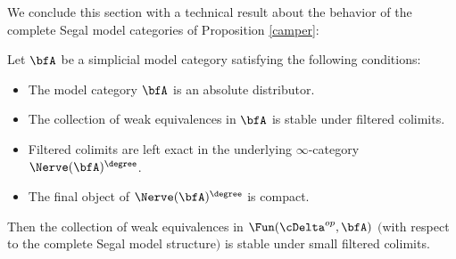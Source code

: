 We conclude this section with a technical result about the behavior of the complete
Segal model categories of Proposition \ref{camper}:

\begin{proposition}\label{smashet}
Let $\bfA$ be a simplicial model category satisfying the following conditions:
\begin{itemize}
\item[$(a)$] The model category $\bfA$ is an absolute distributor.
\item[$(b)$] The collection of weak equivalences in $\bfA$ is stable under filtered colimits.
\item[$(c)$] Filtered colimits are left exact in the underlying $\infty$-category $\Nerve( \bfA)^{\degree}$.
\item[$(d)$] The final object of $\Nerve( \bfA)^{\degree}$ is compact. 
\end{itemize}
Then the collection of weak equivalences in $\Fun( \cDelta^{op}, \bfA)$
$($with respect to the complete Segal model structure$)$ is stable under small filtered colimits.
\end{proposition}


